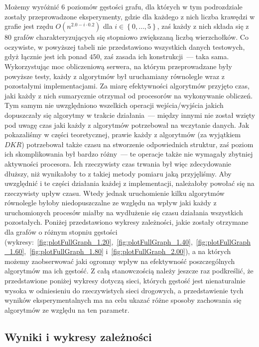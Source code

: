 Możemy wyróżnić $6$ poziomów gęstości grafu, dla których w tym podrozdziale zostały przeprowadzone eksperymenty, gdzie dla każdego z nich liczba krawędzi w grafie jest rzędu $O \left( n^{2.0-i \cdot 0.2} \right)$ dla $i \in \left\{ 0, \dots, 5 \right\}$, zaś każdy z nich składa się z $80$ grafów charakteryzujących się stopniowo zwiększaną liczbą wierzchołków.
Co oczywiste, w powyższej tabeli nie przedstawiono wszystkich danych testowych, gdyż łącznie jest ich ponad $450$, zaś zasada ich konstrukcji~--- taka sama.
Wykorzystując moc obliczeniową serwera, na którym przeprowadzane były powyższe testy, każdy z algorytmów był uruchamiany równolegle wraz z pozostałymi implementacjami. Za miarę efektywności algorytmów przyjęto czas, jaki każdy z nich sumarycznie otrzymał od procesorów na wykonywanie obliczeń.
Tym samym nie uwzględniono wszelkich operacji wejścia/wyjścia jakich dopuszczały się algorytmy w trakcie działania~--- między innymi nie został wzięty pod uwagę czas jaki każdy z algorytmów potrzebował na wczytanie danych.
Jak pokazaliśmy w części teoretycznej, prawie każdy z algorytmów (za wyjątkiem $DKR$) potrzebował także czasu na stworzenie odpowiednich struktur, zaś poziom ich skomplikowania był bardzo różny~--- te operacje także nie wymagały zbytniej aktywności procesora. Ich rzeczywisty czas trwania był więc zdecydowanie dłuższy, niż wynikałoby to z takiej metody pomiaru jaką przyjęliśmy.
Aby uwzględnić i te części działania każdej z implementacji, należałoby powołać się na rzeczywisty upływ czasu.
Wtedy jednak uruchomienie kilku algorytmów równolegle byłoby niedopuszczalne ze względu na wpływ jaki każdy z uruchomionych procesów miałby na wydłużenie się czasu działania wszystkich pozostałych.
Poniżej przedstawiono wykresy zależności, jakie zostały otrzymane dla grafów o różnym stopniu gęstości (wykresy:~\ref{fig:plotFullGraph_1.20},~\ref{fig:plotFullGraph_1.40},~\ref{fig:plotFullGraph_1.60},~\ref{fig:plotFullGraph_1.80} i~\ref{fig:plotFullGraph_2.00}), a na których możemy zaobserwować jaki ogromny wpływ na efektywność poszczególnych algorytmów ma ich gęstość.
Z całą stanowczością należy jeszcze raz podkreślić, że przedstawione poniżej wykresy dotyczą sieci, których gęstość jest nienaturalnie wysoka w odniesieniu do rzeczywistych sieci drogowych, a przedstawienie tych wyników eksperymentalnych ma na celu ukazać różne sposoby zachowania się algorytmów ze względu na ten parametr.



\subsection{Wyniki i wykresy zależności}



